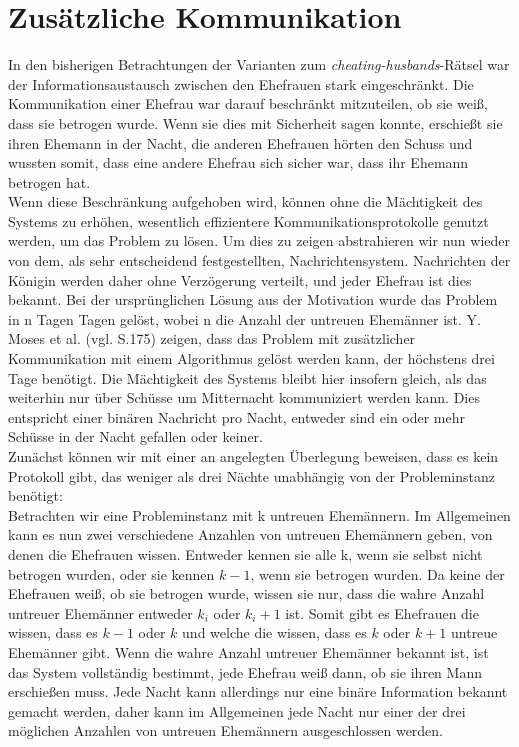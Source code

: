 \section{Zusätzliche Kommunikation}
\label{Kommuniaktion}
In den bisherigen Betrachtungen der Varianten zum \textit{cheating-husbands}-Rätsel war der Informationsaustausch zwischen den Ehefrauen stark eingeschränkt.
Die Kommunikation einer Ehefrau war darauf beschränkt mitzuteilen, ob sie weiß, dass sie betrogen wurde.
Wenn sie dies mit Sicherheit sagen konnte, erschießt sie ihren Ehemann in der Nacht, die anderen Ehefrauen hörten den Schuss und wussten somit, dass eine andere Ehefrau sich sicher war, dass ihr Ehemann betrogen hat.\\
Wenn diese Beschränkung aufgehoben wird, können ohne die Mächtigkeit des Systems zu erhöhen, wesentlich effizientere Kommunikationsprotokolle genutzt werden, um das Problem zu lösen.
Um dies zu zeigen abstrahieren wir nun wieder von dem, als sehr entscheidend festgestellten, Nachrichtensystem. 
Nachrichten der Königin werden daher ohne Verzögerung verteilt, und jeder Ehefrau ist dies bekannt.
Bei der ursprünglichen Lösung aus der Motivation wurde das Problem in n Tagen Tagen gelöst, wobei n die Anzahl der untreuen Ehemänner ist.
Y. Moses et al. \cite{moses1986cheating} (vgl. S.175) zeigen, dass das Problem mit zusätzlicher Kommunikation mit einem Algorithmus gelöst werden kann, der höchstens drei Tage benötigt.
Die Mächtigkeit des Systems bleibt hier insofern gleich, als das weiterhin nur über Schüsse um Mitternacht kommuniziert werden kann. Dies entspricht einer binären Nachricht pro Nacht, entweder sind ein oder mehr Schüsse in der Nacht gefallen oder keiner.\\
Zunächst können wir mit einer an \cite{moses1986cheating} angelegten Überlegung beweisen, dass es kein Protokoll gibt, das weniger als drei Nächte unabhängig von der Probleminstanz benötigt:\\

Betrachten wir eine Probleminstanz mit k untreuen Ehemännern.
Im Allgemeinen kann es nun zwei verschiedene Anzahlen von untreuen Ehemännern geben, von denen die Ehefrauen wissen.
Entweder kennen sie alle k, wenn sie selbst nicht betrogen wurden, oder sie kennen $k-1$, wenn sie betrogen wurden.
Da keine der Ehefrauen weiß, ob sie betrogen wurde, wissen sie nur, dass die wahre Anzahl untreuer Ehemänner entweder $k_i$ oder $k_i+1$ ist.
Somit gibt es Ehefrauen die wissen, dass es $k-1$ oder $k$ und welche die wissen, dass es $k$ oder $k+1$ untreue Ehemänner gibt.
Wenn die wahre Anzahl untreuer Ehemänner bekannt ist, ist das System vollständig bestimmt, jede Ehefrau weiß dann, ob sie ihren Mann erschießen muss.
Jede Nacht kann allerdings nur eine binäre Information bekannt gemacht werden, daher kann im Allgemeinen jede Nacht nur einer der drei möglichen Anzahlen von untreuen Ehemännern ausgeschlossen werden.

